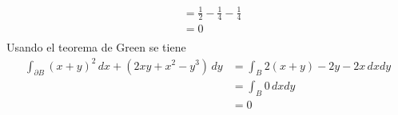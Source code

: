\begin{enumerate}[label=\alph*)]
\begin{equation}
\begin{split}
        &= \frac{1}{2}-\frac{1}{4}-\frac{1}{4}\\
        &=0\\
    \end{split}
    \nonumber
    \end{equation}
    Usando el teorema de Green se tiene
    \begin{equation}
    \begin{split}
        \int_{\partial B} (x+y)^2\,dx + (2xy+x^2-y^3)\,dy &=
        \int_B 2(x+y)-2y-2x\,dxdy\\
        &= \int_B 0\,dxdy\\
        &= 0\\
    \end{split}
    \nonumber
    \end{equation}
\end{enumerate}

\newpage
